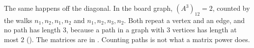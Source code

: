 \begin{remark}\label{rem:board3}
The same happens off the diagonal. In the board graph, $(A^3)_{12}=2$, counted by the walks $n_1,n_2,n_1,n_2$ and $n_1,n_2,n_3,n_2$. Both repeat a vertex and an edge, and no path has length $3$, because a path in a graph with $3$ vertices has length at most $2$ (). The matrices are in . Counting paths is not what a matrix power does.
\end{remark}
